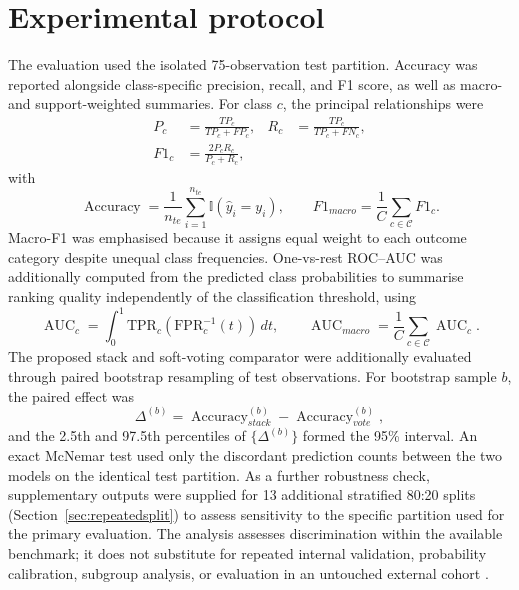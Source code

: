 \documentclass[a4paper,fleqn]{cas-dc}
\begin{document}
\section{Experimental protocol}
\label{sec:protocol}
The evaluation used the isolated 75-observation test partition. Accuracy was reported alongside class-specific precision, recall, and F1 score, as well as macro- and support-weighted summaries. For class $c$, the principal relationships were
\begin{equation}
\begin{aligned}
P_c&=\frac{TP_c}{TP_c+FP_c}, &
R_c&=\frac{TP_c}{TP_c+FN_c},\\
F1_c&=\frac{2P_cR_c}{P_c+R_c},
\end{aligned}
\label{eq:classmetrics}
\end{equation}
with
\begin{equation}
\operatorname{Accuracy}=\frac{1}{n_{te}}\sum_{i=1}^{n_{te}}\mathbb{I}(\hat y_i=y_i),
\qquad
F1_{macro}=\frac{1}{C}\sum_{c\in\mathcal{C}}F1_c.
\label{eq:aggregatemetrics}
\end{equation}
Macro-F1 was emphasised because it assigns equal weight to each outcome category despite unequal class frequencies. One-vs-rest ROC--AUC was additionally computed from the predicted class probabilities to summarise ranking quality independently of the classification threshold, using
\begin{equation}
\operatorname{AUC}_c=\int_0^1 \mathrm{TPR}_c(\mathrm{FPR}_c^{-1}(t))\,dt,
\qquad
\operatorname{AUC}_{macro}=\frac{1}{C}\sum_{c\in\mathcal{C}}\operatorname{AUC}_c.
\label{eq:auc}
\end{equation}
The proposed stack and soft-voting comparator were additionally evaluated through paired bootstrap resampling of test observations. For bootstrap sample $b$, the paired effect was
\begin{equation}
\Delta^{(b)}=\operatorname{Accuracy}^{(b)}_{stack}
-\operatorname{Accuracy}^{(b)}_{vote},
\label{eq:bootstrap}
\end{equation}
and the 2.5th and 97.5th percentiles of $\{\Delta^{(b)}\}$ formed the 95\% interval. An exact McNemar test used only the discordant prediction counts between the two models on the identical test partition. As a further robustness check, supplementary outputs were supplied for 13 additional stratified 80:20 splits (Section~\ref{sec:repeatedsplit}) to assess sensitivity to the specific partition used for the primary evaluation. The analysis assesses discrimination within the available benchmark; it does not substitute for repeated internal validation, probability calibration, subgroup analysis, or evaluation in an untouched external cohort \cite{collins2024,riley2024,rileysample2024}.
\end{document}
